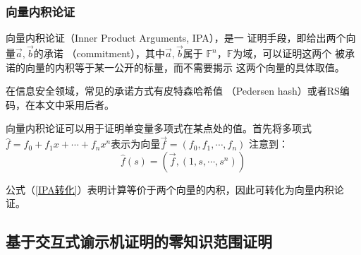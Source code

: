 \documentclass[zihao=-4]{ctexart}
\begin{document}
\begin{spacing}{1.5}
\subsubsection{向量内积论证}
向量内积论证（Inner Product Arguments, IPA），是一
证明手段，即给出两个向量$\vec{a},\vec{b}$的承诺
（commitment），其中$\vec{a},\vec{b}$属于
$\mathbb{F}^n$，$\mathbb{F}$为域，可以证明这两个
被承诺的向量的内积等于某一公开的标量，而不需要揭示
这两个向量的具体取值。\par
在信息安全领域，常见的承诺方式有皮特森哈希值
（Pedersen hash）或者RS编码，在本文中采用后者。\par
向量内积论证可以用于证明单变量多项式在某点处的值。首先将多项式
$\hat{f}=f_0+f_1x+\cdots+f_nx^n$表示为向量$\vec{f}=(f_0,f_1,\cdots,f_n)$
注意到：
\begin{equation}\hat{f}(s)=(\vec{f},(1,s,\cdots,s^n))\label{IPA转化}\end{equation}\par
公式（\ref{IPA转化}）表明计算等价于两个向量的内积，因此可转化为向量内积论证。

\subsection{基于交互式谕示机证明的零知识范围证明}

\end{spacing}
\end{document}

